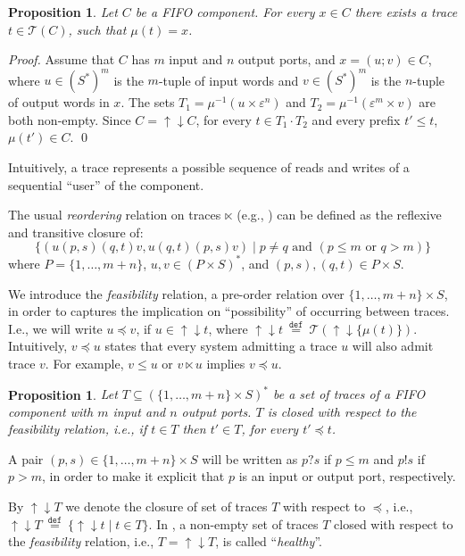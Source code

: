 \documentclass{llncs}
\newtheorem{prop}[thm]{Proposition}
\newcommand{\udarrow}{{\uparrow\downarrow}}
\newcommand{\df}[1]{\ \stackrel{\mathtt{def}}{#1}\ }
\begin{document}
\begin{prop}
  Let $C$ be a FIFO component.  For every $x\in C$ there exists a
  trace $t\in\mathcal{T}(C)$, such that $\mu(t)=x$.
\end{prop}

\begin{proof}
  Assume that $C$ has $m$ input and $n$ output ports, and $x=(u;v)\in
  C$, where $u\in(S^\ast)^m$ is the $m$-tuple of input words and
  $v\in(S^\ast)^m$ is the $n$-tuple of output words in $x$.  The sets
  $T_1=\mu^{-1}(u\times \varepsilon^n)$ and
  $T_2=\mu^{-1}(\varepsilon^m\times v)$ are both non-empty. Since
  $C={\udarrow}C$, for every $t\in T_1\cdot T_2$ and every
  prefix $t'\leq t$, $\mu(t')\in C$.  \qed
\end{proof}

Intuitively, a trace represents a possible sequence of reads and
writes of a sequential ``user'' of the component. 

The usual \emph{reordering} relation on traces $\ltimes$ (e.g.,
\cite{josephs-04}) can be defined as the reflexive and transitive closure of:
\[ 
\{(u (p,s) (q,t) v, u (q,t) (p,s) v) \mid p\neq q \mbox{ and } (p\leq
m \mbox{ or } q > m) \}
\] 
where $P=\{1,\ldots,m+n\}$, $u,v\in (P\times S)^\ast$, and
$(p,s),(q,t)\in P\times S$.

We introduce the \emph{feasibility} relation, a pre-order relation
over $\{1,\ldots,m+n\}\times S$, in order to captures the implication
on ``possibility'' of occurring between traces. I.e., we will write
$u\preceq v$, if $u\in {\udarrow}t$, where ${\udarrow}t \df{=}
\mathcal{T}({\udarrow}\{\mu(t)\})$. Intuitively, $v \preceq u$ states
that every system admitting a trace $u$ will also admit trace $v$. For
example, $v\leq u$ or $v \ltimes u$ implies $v\preceq u$.

\begin{prop}\label{prop:traces}
  Let $T\subseteq (\{1,\ldots,m+n\}\times S)^\ast$ be a set of traces
  of a FIFO component with $m$ input and $n$ output ports. $T$ is
  closed with respect to the \emph{feasibility} relation, i.e., if
  $t\in T$ then $t'\in T$, for every $t'\preceq t$.
\end{prop}

A pair $(p,s)\in \{1,\ldots,m+n\}\times S$ will be written as $p?s$ if
$p\leq m$ and $p!s$ if $p> m$, in order to make it explicit that $p$ is
an input or output port, respectively.

By ${\udarrow}T$ we denote the closure of set of traces $T$ with respect to
$\preceq$, i.e., ${\udarrow}T\df{=}\{{\udarrow}t\mid t\in T\}$.  In
\cite{josephs-04}, a non-empty set of traces $T$ closed with respect
to the \emph{feasibility} relation, i.e., $T={\udarrow}T$, is called
``\emph{healthy}''.
\end{document}
